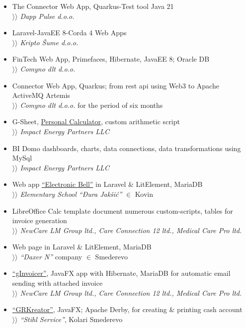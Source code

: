 \documentclass[12pt]{article}
\begin{document}
\begin{itemize}[parsep=1.5pt]
    \item The Connector Web App, Quarkus-Test tool Java 21 \\
        $\rangle\!\rangle$ \textit{Dapp Pulse d.o.o.}
    \item Laravel-JavaEE 8-Corda 4 Web Apps \\
        $\rangle\!\rangle$ \textit{Kripto Šume d.o.o.}
    \item FinTech Web App, Primefaces, Hibernate, JavaEE 8; Oracle DB \\
        $\rangle\!\rangle$ \textit{Comyno dlt d.o.o.}
    \item Connector Web App, Quarkus; from rest api using Web3 to Apache ActiveMQ Artemis \\
        $\rangle\!\rangle$ \textit{Comyno dlt d.o.o.} for the period of six months
    \item G-Sheet, \href{https://docs.google.com/spreadsheets/d/1ztJoonmA0d0AyNDwVE1vnjpOPPpM03JF1eWCHwfQ4ZA/edit?usp=sharing}{Personal Calculator}, custom arithmetic script \\
        $\rangle\!\rangle$ \textit{Impact Energy Partners LLC}
    \item BI Domo dashboards, charts, data connections, data transformations using MySql \\
        $\rangle\!\rangle$ \textit{Impact Energy Partners LLC}
    \item Web app \href{https://zvono.nastavnikinformatike.com}{``Electronic Bell''} in Laravel \& LitElement, MariaDB \\
        $\rangle\!\rangle$ \textit{Elementary School ``Đura Jakšić''} $\in$ Kovin
    \item LibreOffice Calc template document numerous custom-scripts, tables for invoice generation \\ 
        $\rangle\!\rangle$ \textit{NewCare LM Group ltd., Care Connection 12 ltd., Medical Care Pro ltd.}
    \item Web page in Laravel \& LitElement, MariaDB \\
        $\rangle\!\rangle$ \textit{``Daxer N''} company $\in$ Smederevo
    \item \href{https://github.com/goranrsbg/gInvoicer}{``gInvoicer''}, JavaFX app with Hibernate, MariaDB for automatic email sending with attached invoice \\
        $\rangle\!\rangle$ \textit{NewCare LM Group ltd., Care Connection 12 ltd., Medical Care Pro ltd.}
    \item \href{https://github.com/goranrsbg/GRKreator}{``GRKreator''}, JavaFX; Apache Derby, for creating \& printing cash account \\
        $\rangle\!\rangle$ \textit{``Stihl Service''}, Kolari Smederevo
\end{itemize}
\end{document}
